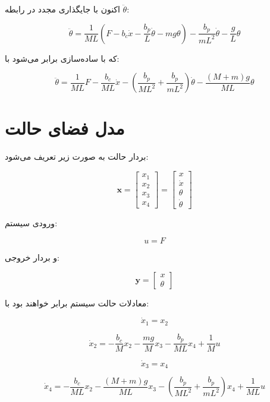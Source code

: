 \documentclass[a4paper,12pt]{article}
\begin{document}
اکنون با جایگذاری مجدد در رابطه $\ddot{\theta}$:

\[
    \ddot{\theta}
    =
    \frac{1}{ML}
    \left(
    F
    -
    b_c\dot{x}
    -
    \frac{b_p}{L}\dot{\theta}
    -
    mg\theta
    \right)
    -
    \frac{b_p}{mL^2}\dot{\theta}
    -
    \frac{g}{L}\theta
\]

که با ساده‌سازی برابر می‌شود با:

\[
    \ddot{\theta}
    =
    \frac{1}{ML}F
    -
    \frac{b_c}{ML}\dot{x}
    -
    \left(
    \frac{b_p}{ML^2}
    +
    \frac{b_p}{mL^2}
    \right)\dot{\theta}
    -
    \frac{(M+m)g}{ML}\theta
\]

\section{مدل فضای حالت}

بردار حالت به صورت زیر تعریف می‌شود:

\[
    \mathbf{x}
    =
    \begin{bmatrix}
        x_1 \\
        x_2 \\
        x_3 \\
        x_4
    \end{bmatrix}
    =
    \begin{bmatrix}
        x       \\
        \dot{x} \\
        \theta  \\
        \dot{\theta}
    \end{bmatrix}
\]

ورودی سیستم:

\[
    u = F
\]

و بردار خروجی:

\[
    \mathbf{y}
    =
    \begin{bmatrix}
        x \\
        \theta
    \end{bmatrix}
\]

معادلات حالت سیستم برابر خواهند بود با:

\[
    \dot{x}_1 = x_2
\]

\[
    \dot{x}_2
    =
    -\frac{b_c}{M}x_2
    -
    \frac{mg}{M}x_3
    -
    \frac{b_p}{ML}x_4
    +
    \frac{1}{M}u
\]

\[
    \dot{x}_3 = x_4
\]

\[
    \dot{x}_4
    =
    -\frac{b_c}{ML}x_2
    -
    \frac{(M+m)g}{ML}x_3
    -
    \left(
    \frac{b_p}{ML^2}
    +
    \frac{b_p}{mL^2}
    \right)x_4
    +
    \frac{1}{ML}u
\]
\end{document}
